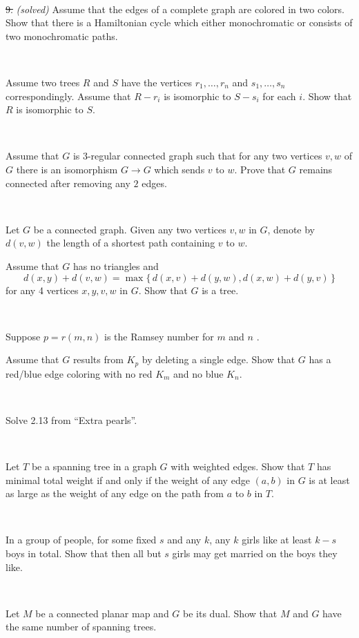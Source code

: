 \documentclass[oneside,a4paper]{article}
\begin{document}
\ 

\noindent \sout{9.} \textit{(solved)} 
Assume that the edges of a complete graph are colored in two colors.
Show that there is a Hamiltonian cycle which either monochromatic or consists of two monochromatic paths.

\ 

Assume two trees $R$ and $S$ 
have the vertices $r_1,\dots,r_n$ and $s_1,\dots,s_n$ correspondingly.
Assume that $R-r_i$ is isomorphic to $S-s_i$ for each $i$.
Show that $R$ is isomorphic to $S$.

\ 

Assume that $G$ is $3$-regular connected graph such that 
for any two vertices $v,w$ of $G$ there is an isomorphism
$G\to G$ which sends $v$ to $w$.
Prove that $G$ remains connected after removing any $2$ edges.

\ 

Let $G$ be a connected graph.
Given any two vertices $v,w$ in $G$, denote by $d(v,w)$ the length of a shortest path containing $v$ to $w$. 

Assume that $G$ has no triangles and
\[d(x,y)+d(v,w)=\max\{\,d(x,v)+d(y,w),d(x,w)+d(y,v)\,\}\]
for any 4 vertices $x,y,v,w$ in $G$.
Show that $G$ is a tree.

\ 

Suppose $p=r(m,n)$ is the Ramsey number for $m$ and $n$%
.

Assume that $G$ results from $K_p$ by deleting a single edge.
Show that $G$ has a red/blue edge coloring with no red
$K_m$ and no blue $K_n$.

\ 

 Solve 2.13 from ``Extra pearls''.

\ 

 Let $T$ be a spanning tree in a graph $G$ with weighted edges.
Show that $T$ has minimal total weight if and only if the weight of any edge $(a,b)$ in $G$ is at least as large as the weight of any edge on the path from $a$ to $b$ in $T$. 

\ 

 In a group of people, for some fixed $s$ and any $k$,
any $k$ girls like at least $k-s$ boys in total.
Show that then all but $s$ girls may get married on the boys they like.


\ 

Let $M$ be a connected planar map and $G$ be its dual.
Show that $M$ and $G$ have the same number of spanning trees.
\end{document}
